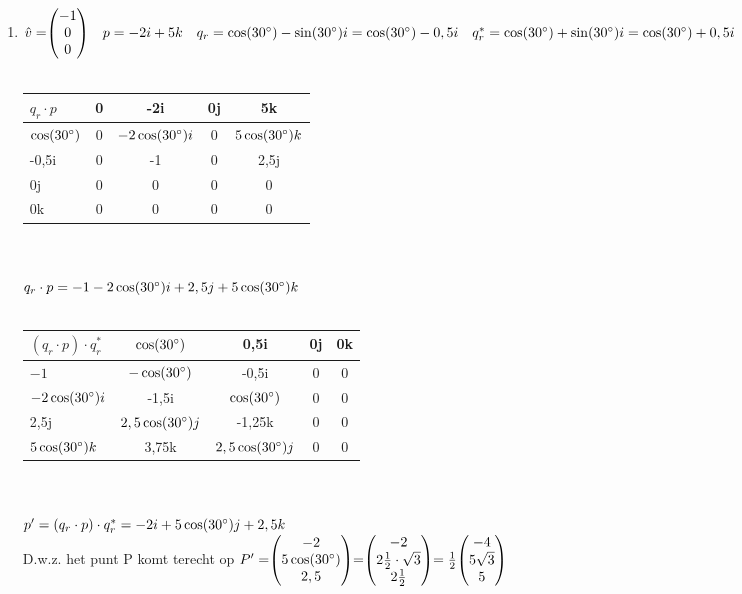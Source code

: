 \begin{enumerate}
	\item
	$\hat{v} = \vecdrie{-1}{0}{0} \quad p = -2i +5k   \\
	\quad q_r = \cos(30 \degree) -\sin(30 \degree) i  =  \cos(30 \degree) - 0,5i \\
	\quad q^*_r =  \cos(30 \degree) + \sin(30 \degree) i  =  \cos(30 \degree) + 0,5i $ \\ \\
	\begin{tabular}{ | l || c | c |c |c |}
		\hline
		$ q_r\cdot p $ & 0 & -2i   & 0j & 5k \\ \hline \hline
		$\cos(30 \degree)   $  & 0 &  $-2\cos(30 \degree) i  $
		&   0    &  $5\cos(30 \degree) k  $ \\ \hline
		-0,5i   & 0 &  -1  &   0       & 2,5j  \\ \hline
		0j   & 0 &  0 &   0    & 0\\ \hline
		0k    & 0  & 0   & 0  & 0\\ 
		\hline 
	\end{tabular} \\ \\
	$ q_r\cdot p = -1 -2\cos(30 \degree)i  + 2,5j + 5\cos(30 \degree)k $\\ \\
	\begin{tabular}{ | l || c | c |c |c |}
		\hline
		$ (q_r\cdot p)\cdot q^*_r $ & $ \cos( 30 \degree)  $ & 0,5i   & 0j & 0k \\ \hline \hline
		$-1   $   &  $-\cos(30 \degree)  $ & -0,5i	&   0    &  0 \\ \hline
		$ -2\cos(30 \degree) i  $ & -1,5i &  $ \cos(30 \degree)  $  &0&0\\ \hline
		2,5j   & $ 2,5\cos(30 \degree) j  $ &  -1,25k &   0    & 0\\ \hline
		$ 5\cos(30 \degree) k  $    & 3,75k  & $ 2,5\cos(30 \degree) j  $    & 0  & 0\\ 
		\hline 
	\end{tabular} \\ \\
	$ p' = (q_r\cdot p)\cdot q^*_r = -2i + 5\cos(30 \degree) j  + 2,5k $\\
	D.w.z. het punt P komt terecht op $ P' = \vecdrie{-2}{5\cos(30 \degree)}{2,5}
	= \vecdrie{-2}{2\frac{1}{2}\cdot \sqrt{3}}{2\frac{1}{2}} = \frac{1}{2}\vecdrie{-4}{5\sqrt{3}}{5} $
	
	
	
\end{enumerate}

